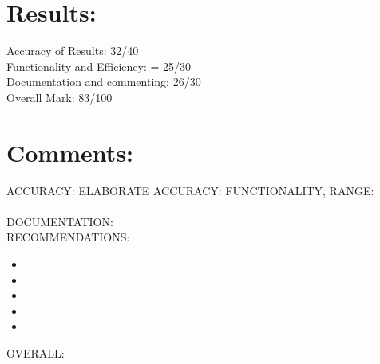 \documentclass[11pt]{article} %
\begin{document}

\section{Results:}

Accuracy of Results: 32/40 \\
Functionality and Efficiency: = 25/30 \\ 
Documentation and commenting: 26/30 \\ 
Overall Mark: 83/100 \\

\section{Comments:}

ACCURACY:
ELABORATE ACCURACY:
FUNCTIONALITY, RANGE:
\\
\\ 
DOCUMENTATION:
\\
RECOMMENDATIONS:
\begin{itemize}
\item {}
\item {}
\item {}
\item {}
\item {}
\end{itemize}
OVERALL: 
\end{document}
